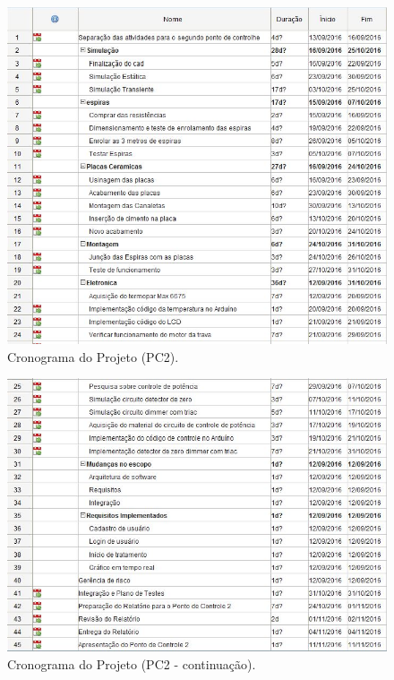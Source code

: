 \begin{figure}[!h]
	\centering
	\label{cronogramapc2}
	\includegraphics[keepaspectratio=true,scale=0.6]{figuras/cronogramapc2.jpg}
	\caption{Cronograma do Projeto (PC2).}
\end{figure}

\begin{figure}[!h]
	\centering
	\label{cronogramapc2_cont}
	\includegraphics[keepaspectratio=true,scale=0.6]{figuras/cronogramapc2_cont.jpg}
	\caption{Cronograma do Projeto (PC2 - continuação).}
\end{figure}
